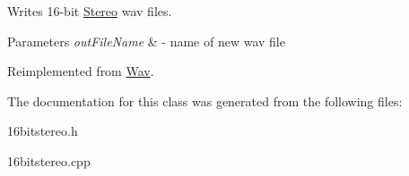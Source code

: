 Writes 16-\/bit \hyperlink{classStereo}{Stereo} wav files.


\begin{DoxyParams}{Parameters}
{\em out\+File\+Name} & -\/ name of new wav file \\
\hline
\end{DoxyParams}


Reimplemented from \hyperlink{classWav_a7bae34f37288c53cb113e76045f78098}{Wav}.



The documentation for this class was generated from the following files\+:\begin{DoxyCompactItemize}
\item 
16bitstereo.\+h\item 
16bitstereo.\+cpp\end{DoxyCompactItemize}
